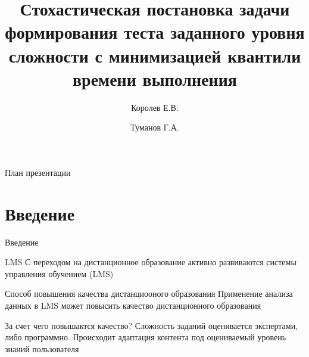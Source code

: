 \documentclass[aspectratio=169]{beamer}
\title[Стохасти- ческая задача формирования теста]{Стохастическая постановка задачи формирования теста заданного уровня сложности с минимизацией квантили времени выполнения}
\author[Королев Егор \and Туманов Георгий]{Королев Е.В. \and Туманов Г.А.}
\institute[НИУ МАИ]{Московский авиационный институт (НИУ)}
\begin{document}
    \begin{frame}
        \maketitle
    \end{frame}

    \begin{frame}{План презентации}
        \tableofcontents
    \end{frame}


    \section{Введение}
    \begin{frame}{Введение}
        \begin{block}{LMS}
            С переходом на дистанционное образование активно развиваются системы управления обучением (LMS)\\
        \end{block}
    
        \begin{block}{Способ повышения качества дистанциооного образования}
            Применение анализа данных в LMS может повысить качество дистанционного образования\\
        \end{block}
    
        \begin{block}{За счет чего повышактся качество?}
            Сложность заданий оценивается экспертами, либо программно. Происходит адаптация контента под оцениваемый уровень знаний пользователя\\
        \end{block}
    \end{frame}
\end{document}
